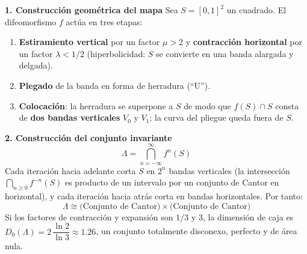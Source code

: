 \documentclass[11pt,a4paper]{article}
\newenvironment{solucion}[1][Solución Detallada]{%
    \vspace{1.5mm}%
    \noindent{\large\textbf{Solución:}}\par\vspace{1.5mm}%
}{%
    \par\vspace{3mm}%
}
\begin{document}
\begin{solucion}

\textbf{\large 1. Construcción geométrica del mapa}
Sea $S = [0,1]^2$ un cuadrado. El difeomorfismo $f$ actúa en tres etapas:
\begin{enumerate}[label=\textbf{(\roman*)}, leftmargin=2.5em]
    \item \textbf{Estiramiento vertical} por un factor $\mu > 2$ y \textbf{contracción horizontal} por un factor $\lambda < 1/2$ (hiperbolicidad: $S$ se convierte en una banda alargada y delgada).
    \item \textbf{Plegado} de la banda en forma de herradura (``U'').
    \item \textbf{Colocación}: la herradura se superpone a $S$ de modo que $f(S) \cap S$ consta de \textbf{dos bandas verticales} $V_0$ y $V_1$; la curva del pliegue queda fuera de $S$.
\end{enumerate}

\begin{center}
\end{center}

\vspace{3.5mm}

\textbf{\large 2. Construcción del conjunto invariante}
\[
\Lambda = \bigcap_{n = -\infty}^{\infty} f^n(S)
\]
Cada iteración hacia adelante corta $S$ en $2^n$ bandas verticales (la intersección $\bigcap_{n \ge 0} f^{-n}(S)$ es producto de un intervalo por un conjunto de Cantor en horizontal), y cada iteración hacia atrás corta en bandas horizontales. Por tanto:
\[
\boxed{\Lambda \cong \text{(Conjunto de Cantor)} \times \text{(Conjunto de Cantor)}}
\]
Si los factores de contracción y expansión son $1/3$ y $3$, la dimensión de caja es $D_0(\Lambda) = 2\,\dfrac{\ln 2}{\ln 3} \approx 1.26$, un conjunto totalmente disconexo, perfecto y de área nula.


\end{solucion}
\end{document}

